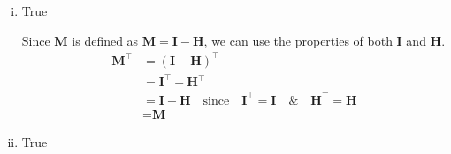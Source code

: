 \documentclass[12pt,letterpaper, onecolumn]{exam}
\begin{document}
\begin{questions}
\begin{solution}
\begin{enumerate}[a.)]
\begin{enumerate}[i.)]
            Calculating directly, 
            \begin{align*}
                \textbf{MY} & = \left[\begin{array}{ccccc}
                 0.4 & -0.4 & -0.2 &  0.0 &  0.2 \\
                -0.4 &  0.7 & -0.2 & -0.1 &  0.0 \\
                -0.2 & -0.2 &  0.8 & -0.2 & -0.2 \\
                 0.0 & -0.1 & -0.2 &  0.7 & -0.4 \\
                 0.2 &  0.0 & -0.2 & -0.4 &  0.4
            \end{array}\right]\left[\begin{array}{c}
                2  \\
                4  \\
                5  \\
                8  \\
                9 
            \end{array} \right] \\
            & = \left[\begin{array}{c}
                0  \\
                0.2  \\
                -0.6  \\
                0.6  \\
                -0.2 
            \end{array} \right] \\
            & = \textbf{e}
            \end{align*}
            \item True

            Since $\textbf{M}$ is defined as $\textbf{M}=\textbf{I} - \textbf{H}$, we can use the properties of both $\textbf{I}$ and $\textbf{H}$.
            \begin{align*}
                \textbf{M}^\intercal & = (\textbf{I} - \textbf{H})^\intercal \\
                &= \textbf{I}^\intercal - \textbf{H}^\intercal \\
                & = \textbf{I} - \textbf{H} \quad \text{since} \quad \textbf{I}^\intercal = \textbf{I} \quad \& \quad \textbf{H}^\intercal = \textbf{H} \\
                & = \textbf{M}
            \end{align*}

            \item True


\end{enumerate}
\end{enumerate}
\end{solution}
\end{questions}
\end{document}
